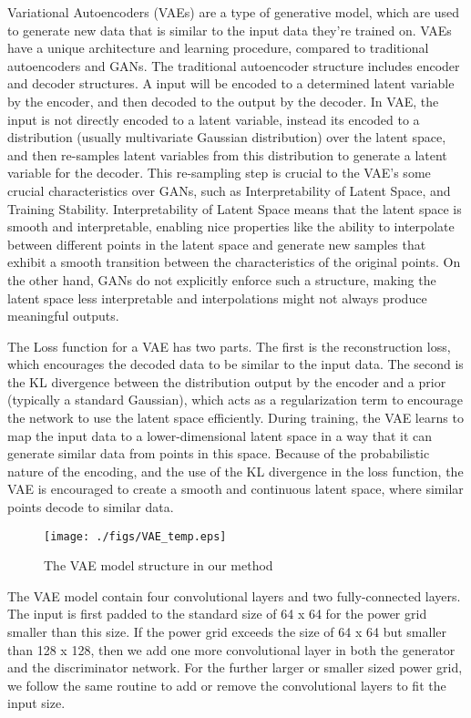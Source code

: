 Variational Autoencoders (VAEs) are a type of generative model, which are used to generate new data that is similar to the input data they're trained on.  VAEs have a unique architecture and learning procedure, compared to traditional autoencoders and GANs.
The traditional autoencoder structure includes encoder and decoder structures. A input will be encoded to a determined latent variable by the encoder, and then decoded to the output by the decoder. 
In VAE, the input is not directly encoded to a latent variable, instead its encoded to a distribution (usually multivariate Gaussian distribution) over the latent space,  and then re-samples latent variables from this distribution to generate a latent variable for the decoder. This re-sampling step is crucial to the VAE's some crucial characteristics over GANs, such as Interpretability of Latent Space, and Training Stability.
Interpretability of Latent Space means that the latent space is smooth and interpretable, enabling nice properties like the ability to interpolate between different points in the latent space and generate new samples that exhibit a smooth transition between the characteristics of the original points. On the other hand, GANs do not explicitly enforce such a structure, making the latent space less interpretable and interpolations might not always produce meaningful outputs. 

The Loss function for a VAE has two parts. The first is the reconstruction loss, which encourages the decoded data to be similar to the input data. The second is the KL divergence between the distribution output by the encoder and a prior (typically a standard Gaussian), which acts as a regularization term to encourage the network to use the latent space efficiently.  During training, the VAE learns to map the input data to a lower-dimensional latent space in a way that it can generate similar data from points in this space. Because of the probabilistic nature of the encoding, and the use of the KL divergence in the loss function, the VAE is encouraged to create a smooth and continuous latent space, where similar points decode to similar data.
\begin{figure*}[h!]
 \centering
 \texttt{[image: ./figs/VAE\_temp.eps]}
\caption{The VAE model structure in our method} 
\label{fig:VAE_architecture}
\end{figure*}

The VAE model contain four convolutional layers and two fully-connected layers. The input is first padded to the standard size of 64 x 64 for the power grid smaller than this size. If the power grid exceeds the size of 64 x 64 but smaller than 128 x 128, then we add one more convolutional layer in both the generator and the discriminator network. For the further larger or smaller sized power grid, we follow the same routine to add or remove the convolutional layers to fit the input size.


